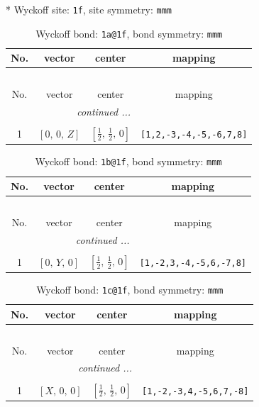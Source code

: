\documentclass[fleqn,8pt]{jsarticle}
\begin{document}
* Wyckoff site: {\tt 1f}, site symmetry: {\tt mmm}
\renewcommand{\arraystretch}{1.2}
\begin{longtable}{cccc}
\caption{Wyckoff bond: {\tt 1a@1f}, bond symmetry: {\tt mmm}}
 \\
 \hline \hline
No. & vector & center & mapping \\ \hline \endfirsthead

\multicolumn{3}{l}{\tablename\ \thetable{}} \\
 \hline \hline
No. & vector & center & mapping \\ \hline \endhead

 \hline \hline
\multicolumn{3}{r}{\footnotesize\it continued ...} \\ \endfoot

 \hline \hline
\multicolumn{3}{r}{} \\ \endlastfoot

1 & $\left[ 0,\, 0,\, Z \right]$ & $\left[ \frac{1}{2},\, \frac{1}{2},\, 0 \right]$ & {\tt [1,2,-3,-4,-5,-6,7,8]} \\
\end{longtable}
\renewcommand{\arraystretch}{1.2}
\begin{longtable}{cccc}
\caption{Wyckoff bond: {\tt 1b@1f}, bond symmetry: {\tt mmm}}
 \\
 \hline \hline
No. & vector & center & mapping \\ \hline \endfirsthead

\multicolumn{3}{l}{\tablename\ \thetable{}} \\
 \hline \hline
No. & vector & center & mapping \\ \hline \endhead

 \hline \hline
\multicolumn{3}{r}{\footnotesize\it continued ...} \\ \endfoot

 \hline \hline
\multicolumn{3}{r}{} \\ \endlastfoot

1 & $\left[ 0,\, Y,\, 0 \right]$ & $\left[ \frac{1}{2},\, \frac{1}{2},\, 0 \right]$ & {\tt [1,-2,3,-4,-5,6,-7,8]} \\
\end{longtable}
\renewcommand{\arraystretch}{1.2}
\begin{longtable}{cccc}
\caption{Wyckoff bond: {\tt 1c@1f}, bond symmetry: {\tt mmm}}
 \\
 \hline \hline
No. & vector & center & mapping \\ \hline \endfirsthead

\multicolumn{3}{l}{\tablename\ \thetable{}} \\
 \hline \hline
No. & vector & center & mapping \\ \hline \endhead

 \hline \hline
\multicolumn{3}{r}{\footnotesize\it continued ...} \\ \endfoot

 \hline \hline
\multicolumn{3}{r}{} \\ \endlastfoot

1 & $\left[ X,\, 0,\, 0 \right]$ & $\left[ \frac{1}{2},\, \frac{1}{2},\, 0 \right]$ & {\tt [1,-2,-3,4,-5,6,7,-8]} \\
\end{longtable}
\end{document}
